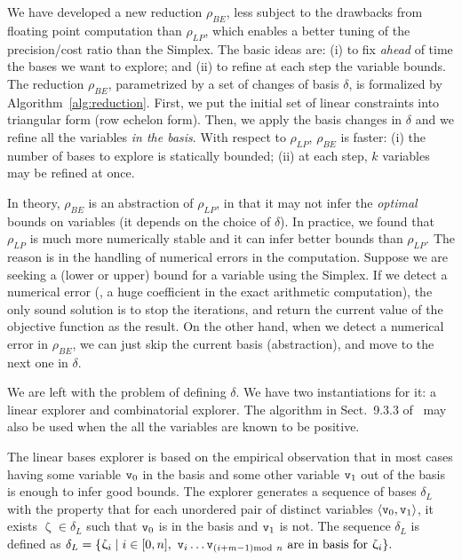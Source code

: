 \documentclass{llncs}
\begin{document}
We have developed a new reduction  $\rho_\mathit{BE}$,  less subject to the drawbacks from floating point computation than $\rho_\mathit{LP}$,  which enables a better tuning of the precision/cost ratio than the Simplex. 
The basic ideas are: (i) to fix \emph{ahead} of time the bases we want to explore; and (ii) to refine at each step the variable bounds.
The reduction $\rho_\mathit{BE}$, parametrized by a set of changes of basis $\delta$, is formalized by Algorithm~\ref{alg:reduction}. 
First, we put the initial set of linear constraints into triangular form (row echelon form). 
Then, we apply the basis changes in $\delta$ and we refine all the variables \emph{in the basis}.
With respect to $\rho_\mathit{LP}$, $\rho_\mathit{BE}$ is faster: (i) the number of bases to explore is statically bounded; (ii) at each step, $k$ variables may be refined at once. 

In theory, $\rho_\mathit{BE}$ is an abstraction of  $\rho_\mathit{LP}$, in that it may not infer the \emph{optimal} bounds on variables (it depends on the choice of $\delta$).
In practice, we found that $\rho_\mathit{LP}$ is much more numerically stable and it can infer better bounds than $\rho_\mathit{LP}$.
The reason  is in  the handling of numerical errors in the computation. 
Suppose we are seeking a (lower or upper) bound for a variable  using the Simplex. 
If we detect a numerical error (\ie, a huge coefficient in the exact arithmetic computation), the only sound solution is to stop the iterations, and return the current value of the objective function as the result.
On the other hand, when we detect a numerical error in $\rho_\mathit{BE}$, we can just skip the current basis (abstraction), and move to the next one in $\delta$.

We are left with the problem of defining $\delta$.
We have two instantiations for it: a linear explorer and combinatorial explorer. 
The algorithm in Sect.~9.3.3 of~\cite{FeretPhD} may also be used when the
all the variables are known to be  positive.

 The linear bases explorer  is based on the empirical observation that in most cases having some variable $\mathtt{v}_0$  in the basis and some other variable $\mathtt{v}_1$ out of the basis is enough to infer good bounds.
The explorer generates a sequence of bases $\delta_L$  with the property that for each unordered pair of distinct variables $\langle \mathtt{v}_0, \mathtt{v}_1 \rangle$, it exists $\upzeta \in \delta_L$ such that $\mathtt{v}_0$ is in the basis and $\mathtt{v}_1$ is not.
The sequence $\delta_L$ is defined as 
\(
\delta_L = \{ \upzeta_i \mid i \in [0, n],\  \mathtt{v}_{i} \dots \mathtt{v}_{(i + m - 1) \mathrm{mod}\ n} \text{ are in basis for}\ \upzeta_i\}.
\)
\end{document}
